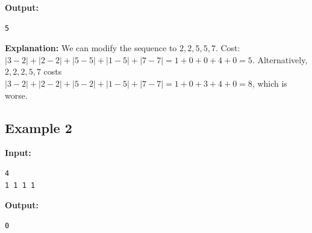 \documentclass[11pt, letterpaper]{article}
\begin{document}
\textbf{Output:}
\begin{verbatim}
5
\end{verbatim}

\textbf{Explanation:}
We can modify the sequence to $2, 2, 5, 5, 7$.
Cost: $|3-2| + |2-2| + |5-5| + |1-5| + |7-7| = 1 + 0 + 0 + 4 + 0 = 5$.
Alternatively, $2, 2, 2, 5, 7$ costs $|3-2| + |2-2| + |5-2| + |1-5| + |7-7| = 1 + 0 + 3 + 4 + 0 = 8$, which is worse.

\subsection*{Example 2}
\textbf{Input:}
\begin{verbatim}
4
1 1 1 1
\end{verbatim}

\textbf{Output:}
\begin{verbatim}
0
\end{verbatim}
\end{document}
